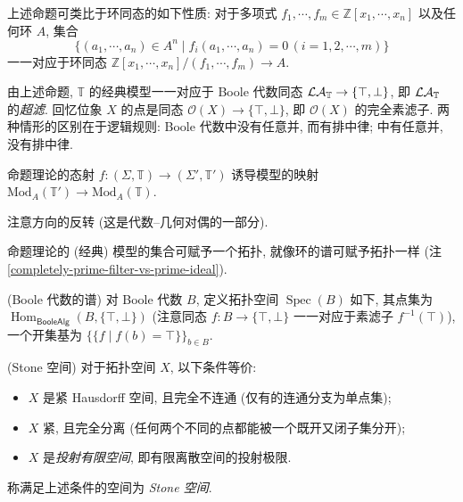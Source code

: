 \begin{remark}
	{}
	上述命题可类比于环同态的如下性质:
	对于多项式 $f_1,\cdots,f_m\in \mathbb{Z}[x_1,\cdots,x_n]$ 以及任何环 $A$, 集合
	$$
	\big\{
	(a_1,\cdots,a_n)\in A^n\mid f_i(a_1,\cdots,a_n)=0\,(i=1,2,\cdots,m)
	\big\}
	$$
	一一对应于环同态 $\mathbb{Z}[x_1,\cdots,x_n]/(f_1,\cdots,f_m) \to A$.
\end{remark}

\begin{remark}
	[label={model-and-ultrafilter}]
	{}
	由上述命题, $\mathbb T$ 的经典模型一一对应于 Boole 代数同态 $\mathcal {LA}_{\mathbb T} \to \{\top,\bot\}$, 即 $\mathcal {LA}_{\mathbb T}$ 的\emph{超滤}.
	回忆位象 $X$ 的点是\fm{}同态 $\mathcal O(X) \to \{\top,\bot\}$, 即 $\mathcal O(X)$ 的完全素滤子. 两种情形的区别在于逻辑规则: Boole 代数中没有任意并, 而有排中律; \fm{}中有任意并, 没有排中律.
\end{remark}

\begin{prop}
	{}
	命题理论的态射 $f\colon (\Sigma,\mathbb T) \to (\Sigma',\mathbb T')$ 诱导模型的映射 $\text{Mod}_A(\mathbb T') \to \text{Mod}_A(\mathbb T)$.
\end{prop}

注意方向的反转 (这是代数--几何对偶的一部分).

命题理论的 (经典) 模型的集合可赋予一个拓扑, 就像环的谱可赋予拓扑一样 (注 \ref{completely-prime-filter-vs-prime-ideal}).

\begin{definition}
	{(Boole 代数的谱)}
	对 Boole 代数 $B$, 定义拓扑空间 $\operatorname{Spec}(B)$ 如下, 其点集为 $\operatorname{Hom}_{\mathsf {BooleAlg}}(B,\{\top,\bot\})$ (注意同态 $f\colon B\to\{\top,\bot\}$ 一一对应于素滤子 $f^{-1}(\top)$), 一个开集基为 $\big\{\{f\mid f(b)=\top\}\big\}_{b\in B}$.
\end{definition}

\begin{propdef}
	{(Stone 空间)}
	对于拓扑空间 $X$, 以下条件等价:
	\begin{itemize}
		\item $X$ 是紧 Hausdorff 空间, 且完全不连通 (仅有的连通分支为单点集);
		\item $X$ 紧, 且完全分离 (任何两个不同的点都能被一个既开又闭子集分开);
		\item $X$ 是\emph{投射有限空间}, 即有限离散空间的投射极限.
	\end{itemize}
	称满足上述条件的空间为 \emph{Stone 空间}.
\end{propdef}

